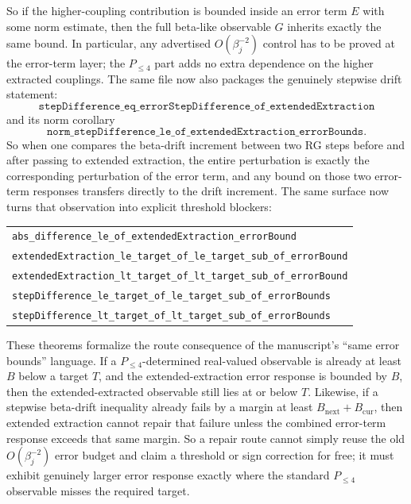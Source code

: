 \documentclass[11pt]{article}
\newcommand{\lean}[1]{\texttt{#1}}
\newcommand{\leansmall}[1]{{\small\texttt{#1}}}
\begin{document}
So if the higher-coupling contribution is bounded inside an error term \(E\)
with some norm estimate, then the full beta-like observable \(G\) inherits
exactly the same bound.  In particular, any advertised \(O(\beta_j^{-2})\)
control has to be proved at the error-term layer; the \(P_{\le 4}\) part adds
no extra dependence on the higher extracted couplings.
The same file now also packages the genuinely stepwise drift statement:
\[
  \lean{stepDifference\_eq\_errorStepDifference\_of\_extendedExtraction}
\]
and its norm corollary
\[
  \lean{norm\_stepDifference\_le\_of\_extendedExtraction\_errorBounds}.
\]
So when one compares the beta-drift increment between two RG steps before and
after passing to extended extraction, the entire perturbation is exactly the
corresponding perturbation of the error term, and any bound on those two
error-term responses transfers directly to the drift increment.
The same surface now turns that observation into explicit threshold blockers:
\begin{center}
\begin{tabular}{l}
\leansmall{abs\_difference\_le\_of\_extendedExtraction\_errorBound}\\
\leansmall{extendedExtraction\_le\_target\_of\_le\_target\_sub\_of\_errorBound}\\
\leansmall{extendedExtraction\_lt\_target\_of\_lt\_target\_sub\_of\_errorBound}\\
\leansmall{stepDifference\_le\_target\_of\_le\_target\_sub\_of\_errorBounds}\\
\leansmall{stepDifference\_lt\_target\_of\_lt\_target\_sub\_of\_errorBounds}
\end{tabular}
\end{center}
These theorems formalize the route consequence of the manuscript's ``same error
bounds'' language.  If a \(P_{\le 4}\)-determined real-valued observable is
already at least \(B\) below a target \(T\), and the extended-extraction error
response is bounded by \(B\), then the extended-extracted observable still lies
at or below \(T\).  Likewise, if a stepwise beta-drift inequality already
fails by a margin at least \(B_{\mathrm{next}} + B_{\mathrm{cur}}\), then
extended extraction cannot repair that failure unless the combined error-term
response exceeds that same margin.  So a repair route cannot simply reuse the
old \(O(\beta_j^{-2})\) error budget and claim a threshold or sign correction
for free; it must exhibit genuinely larger error response exactly where the
standard \(P_{\le 4}\) observable misses the required target.
\end{document}

